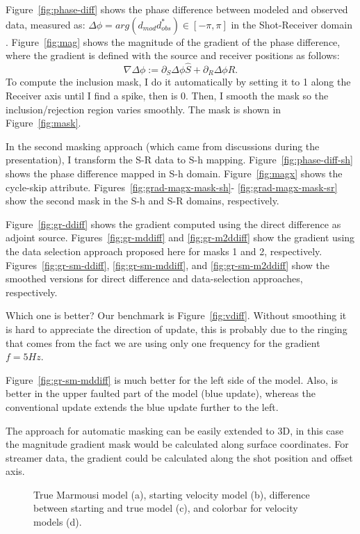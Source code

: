 Figure~\ref{fig:phase-diff} shows the phase difference between modeled and 
observed data, measured as: $\Delta \phi = arg(d_{mod}d_{obs}^*) \in [-\pi,\pi]$ in the
Shot-Receiver domain \citep{qa-fwi}.
 Figure~\ref{fig:mag} shows the magnitude of the gradient of the phase difference, where 
the gradient is defined with the source and receiver positions as follows:
\[
\nabla \Delta \phi := \partial_S\Delta\phi  \hat{S} + \partial_R \Delta\phi \hat{R}.
\]
To compute the inclusion mask, I do it automatically by setting it to 1 along the Receiver
axis until I find a spike, then is 0. Then, I smooth the mask so the inclusion/rejection region
varies smoothly. The mask is shown in Figure~\ref{fig:mask}.  

In the second masking approach (which came from discussions during the presentation), I transform
the S-R data to S-h mapping. Figure~\ref{fig:phase-diff-sh} shows the phase difference mapped
in S-h domain. Figure~\ref{fig:magx} shows the cycle-skip attribute. Figures~\ref{fig:grad-magx-mask-sh}-
\ref{fig:grad-magx-mask-sr} show the second mask in the S-h and S-R domains, respectively. 


Figure~\ref{fig:gr-ddiff} shows the gradient computed using the direct difference as 
adjoint source. Figures~\ref{fig:gr-mddiff} and \ref{fig:gr-m2ddiff}  show
 the gradient using the data selection approach proposed here for masks 1 and 2, respectively. 
Figures~\ref{fig:gr-sm-ddiff}, \ref{fig:gr-sm-mddiff}, and \ref{fig:gr-sm-m2ddiff}
 show the smoothed versions for direct difference and data-selection approaches, respectively. 

Which one is better? Our benchmark is Figure~\ref{fig:vdiff}. Without smoothing
it is hard to appreciate the direction of update, this is probably due to the ringing that
comes from the fact we are using only one frequency for the gradient $f=5Hz$. 

Figure~\ref{fig:gr-sm-mddiff} is much better for the left side 
of the model. Also, is better in the upper faulted part of the model (blue
update), whereas the conventional update extends the blue update further 
to the left. 


The approach for automatic masking can be easily extended to 3D, in this case the 
magnitude gradient mask would be calculated along surface coordinates. For streamer
data, the gradient could be calculated along the shot position and offset axis. 


\begin{figure}
\centering



  \caption{True Marmousi model (a), starting velocity model (b), difference between starting and true model
 (c),  and colorbar for velocity models (d).}
\label{fig:d2}
\end{figure}

